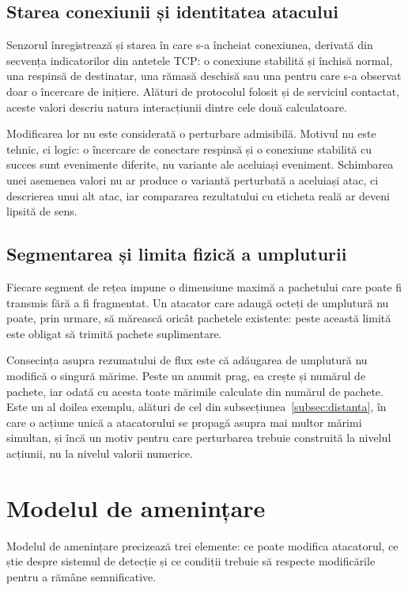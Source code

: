 \subsection{Starea conexiunii și identitatea atacului}\label{subsec:stare}

Senzorul înregistrează și starea în care s-a încheiat conexiunea, derivată din secvența indicatorilor din antetele TCP: o conexiune stabilită și închisă normal, una respinsă de destinatar, una rămasă deschisă sau una pentru care s-a observat doar o încercare de inițiere. Alături de protocolul folosit și de serviciul contactat, aceste valori descriu natura interacțiunii dintre cele două calculatoare.

Modificarea lor nu este considerată o perturbare admisibilă. Motivul nu este tehnic, ci logic: o încercare de conectare respinsă și o conexiune stabilită cu succes sunt evenimente diferite, nu variante ale aceluiași eveniment. Schimbarea unei asemenea valori nu ar produce o variantă perturbată a aceluiași atac, ci descrierea unui alt atac, iar compararea rezultatului cu eticheta reală ar deveni lipsită de sens.

\subsection{Segmentarea și limita fizică a umpluturii}\label{subsec:mtu}

Fiecare segment de rețea impune o dimensiune maximă a pachetului care poate fi transmis fără a fi fragmentat. Un atacator care adaugă octeți de umplutură nu poate, prin urmare, să mărească oricât pachetele existente: peste această limită este obligat să trimită pachete suplimentare.

Consecința asupra rezumatului de flux este că adăugarea de umplutură nu modifică o singură mărime. Peste un anumit prag, ea crește și numărul de pachete, iar odată cu acesta toate mărimile calculate din numărul de pachete. Este un al doilea exemplu, alături de cel din subsecțiunea~\ref{subsec:distanta}, în care o acțiune unică a atacatorului se propagă asupra mai multor mărimi simultan, și încă un motiv pentru care perturbarea trebuie construită la nivelul acțiunii, nu la nivelul valorii numerice.

\section{Modelul de amenințare}\label{sec:threat}

Modelul de amenințare precizează trei elemente: ce poate modifica atacatorul, ce știe despre sistemul de detecție și ce condiții trebuie să respecte modificările pentru a rămâne semnificative.


